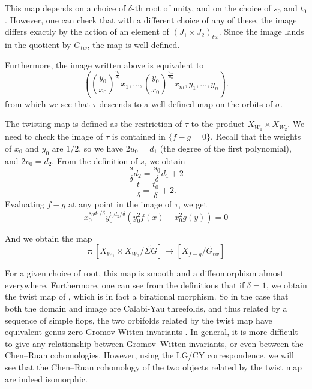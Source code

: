 \documentclass[10pt, letterpaper]{amsart}
\theoremstyle{remark}
\newcommand{\tw}[1]{{#1}_{tw}}
\newcommand{\s}[1]{\Sigma #1}
\begin{document}
This map depends on a choice of $\delta$-th root of unity, and on the choice of $s_0$ and $t_0$. However, one can check that with a different choice of any of these, the image differs exactly by the action of an element of $\tw{(J_1\times J_2)}$. Since the image lands in the quotient by $\tw{G}$, the map is well-defined.


Furthermore, the image written above is equivalent to 
\[
\left(\left(\frac{y_0}{x_0}\right)^{\frac{u_1}{u_0}}x_1, \ldots, \left(\frac{y_0}{x_0}\right)^{\frac{u_m}{u_0}}x_m, y_1, \ldots, y_n\right).
\]
from which we see that $\tau$ descends to a well-defined map on the orbits of $\sigma$. 

The twisting map is defined as the restriction of $\tau$ to the product $X_{W_1}\times X_{W_2}$. We need to check the image of $\tau$ is contained in  $\{f-g=0\}$. Recall that the weights of $x_0$ and $y_0$ are $1/2$, so we have $2u_0=d_1$ (the degree of the first polynomial), and $2v_0=d_2$. From the definition of $s$, we obtain
\[
\frac s\delta d_2=\frac{s_0}{\delta}d_1+2 
\]
\[
\frac t\delta=\frac{t_0}{\delta}+2. 
\]
Evaluating $f-g$ at any point in the image of $\tau$, we get 
\[
x_0^{s_0d_1/\delta}y_0^{t_0d_2/\delta}(y_0^{2}f(x)-x_0^2g(y))=0 
\]

And we obtain the map 
\[
\tau:[X_{W_1}\times X_{W_2}/\widetilde{\s{G}}]\to [X_{f-g}/\widetilde{\tw{G}}]
\]


For a given choice of root, this map is smooth and a diffeomorphism almost everywhere. Furthermore, one can see from the definitions that if $\delta=1$, we obtain the twist map of \cite{ABS}, which is in fact a birational morphism.  %
So in the case that both the domain and image are Calabi-Yau threefolds, and thus related by a sequence of simple flops, the two orbifolds related by the twist map have equivalent genus-zero Gromov-Witten invariants \cite{LR}. In general, it is more difficult to give any relationship between Gromov--Witten invariants, or even between the Chen--Ruan cohomologies. However, using the LG/CY correspondence, we will see that the Chen--Ruan cohomology of the two objects related by the twist map are indeed isomorphic. 
\end{document}
